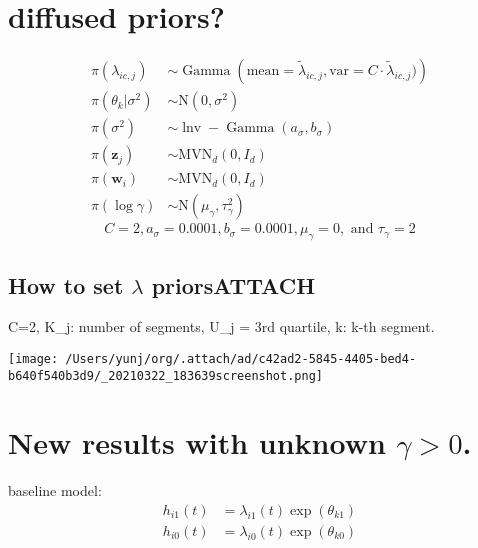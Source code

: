 \documentclass[letterpaper,11pt]{article}
\begin{document}
\section*{diffused priors?}
\label{sec:org891850c}
\begin{align*}
\pi\left(\lambda_{ic,j}\right) & \sim \operatorname{Gamma}\left(\text{mean} = \tilde \lambda_{ic,j}, \text{var} = C \cdot \tilde \lambda_{ic,j})\right) \\
\pi\left(\theta_{k} | \sigma^{2}\right) & \sim \mathrm{N}\left(0, \sigma^{2}\right) \\ \pi\left(\sigma^{2}\right) & \sim \operatorname{lnv}-\operatorname{Gamma}\left(a_{\sigma}, b_{\sigma}\right) \\
\pi\left(\mathbf{z}_{j}\right) & \sim \mathrm{MVN}_{d}\left(0, I_{d}\right) \\
\pi\left(\mathbf{w}_{i}\right) & \sim \mathrm{MVN}_{d}\left(0, I_{d}\right) \\
\pi(
\log \gamma) & \sim \mathrm{N}\left(\mu_{\gamma}, \tau_{\gamma}^{2}\right)
\end{align*}
\[C = 2, a_{\sigma}=0.0001, b_{\sigma}=0.0001, \mu_{\gamma}=0, \text { and } \tau_{\gamma}^{}=2\]
\subsection*[How to set \(\lambda\) priors]{How to set \(\lambda\) priors\hfill{}\textsc{ATTACH}}
\label{sec:org85b5ee2}
C=2, K\_j: number of segments, U\_j = 3rd quartile, k: k-th segment.
\begin{center}
\texttt{[image: /Users/yunj/org/.attach/ad/c42ad2-5845-4405-bed4-b640f540b3d9/\_20210322\_183639screenshot.png]}
\end{center}
\section*{New results with unknown \(\gamma > 0\).}
\label{sec:org12f4918}
baseline model:
\begin{align*}
h_{i1}(t) &= \lambda_{i1}(t) \exp(\theta_{k1})\\
h_{i0}(t) &= \lambda_{i0}(t) \exp(\theta_{k0})\\
\end{align*}
\end{document}
